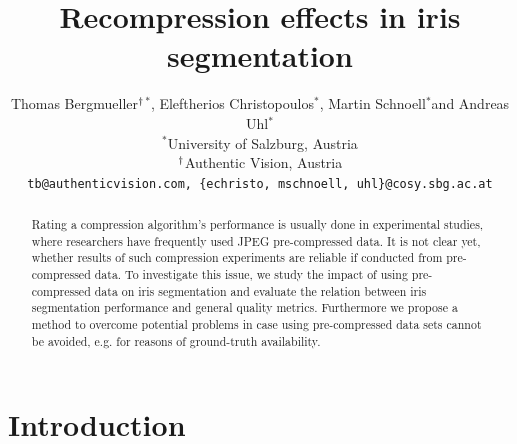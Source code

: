\documentclass[10pt,twocolumn,letterpaper]{article}
\newcommand{\superscript}[1]{\ensuremath{^{\textrm{#1}}}}
\def\wu{\superscript{*}}
\def\wg{\superscript{\dag}}
\begin{document}
\title{Recompression effects in iris segmentation}

\author{Thomas Bergmueller\wg\wu, Eleftherios Christopoulos\wu, Martin Schnoell\wu and Andreas Uhl\wu \\
\wu University of Salzburg, Austria \\
\wg Authentic Vision, Austria\\
{\tt\small tb@authenticvision.com, \{echristo, mschnoell, uhl\}@cosy.sbg.ac.at}
}





\maketitle
\thispagestyle{empty}

\begin{abstract}
	
	Rating a compression algorithm's
	performance is usually done in experimental studies, where researchers have frequently used JPEG pre-compressed data. It is not clear yet,
	whether results of such compression experiments are reliable if conducted from pre-compressed data. 
	To investigate this issue, we study the impact of using pre-compressed data on iris segmentation and evaluate the relation between iris segmentation 
	performance and general quality metrics. Furthermore we propose a method to overcome potential problems in case using
	pre-compressed data sets cannot be avoided, e.g. for reasons of ground-truth availability.
\end{abstract}

\section{Introduction}
\end{document}
